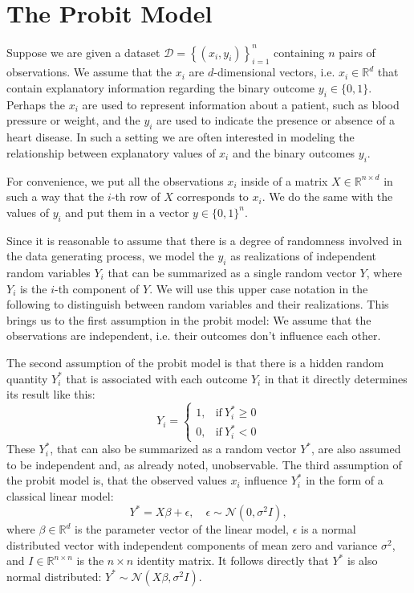 \section{The Probit Model}

Suppose we are given a dataset
$\mathcal{D} = \left\{ (x_i, y_i) \right\}_{i=1}^n$
containing $n$ pairs of observations.
We assume that the $x_i$ are $d$-dimensional vectors, i.e.
$x_i \in \mathbb{R}^d$ that contain explanatory information regarding
the binary outcome $y_i \in \{ 0,  1 \}$.
Perhaps the $x_i$ are used to represent information about a patient,
such as blood pressure or weight, and the $y_i$ are used to indicate
the presence or absence of a heart disease.
In such a setting we are often interested in modeling the relationship
between explanatory values of $x_i$ and the binary outcomes $y_i$.

For convenience, we put all the observations $x_i$ inside of a
matrix $X \in \mathbb{R}^{n \times d}$ in such a way that
the $i$-th row of $X$ corresponds to $x_i$.
We do the same with the values of $y_i$ and put them in a
vector $y \in \{0, 1\}^n$.

Since it is reasonable to assume that there is a degree of randomness
involved in the data generating process, we model the $y_i$ as realizations
of independent random variables $Y_i$ that can be summarized
as a single random vector $Y$, where $Y_i$ is the $i$-th component
of $Y$. We will use this upper case notation
in the following to distinguish between random variables and their
realizations. This brings us to the first assumption in the probit model:
We assume that the observations are independent, i.e. their outcomes don't
influence each other.

The second assumption of the probit model is that there is
a hidden random quantity
$Y_i^\ast$ that is associated with each outcome $Y_i$ in that it
directly determines its result like this:
\begin{equation}
    Y_i =
    \begin{cases}
        1, & \text{if}\ Y_i^\ast \geq 0 \\
        0, & \text{if}\ Y_i^\ast < 0
    \end{cases}
\end{equation}
These $Y_i^\ast$, that can also be summarized as a random vector $Y^\ast$,
are also assumed to be independent and, as already noted, unobservable.
The third assumption of the probit model is, that the observed values
$x_i$ influence $Y_i^\ast$ in the form of a classical linear model:
\begin{equation}
    Y^\ast = X \beta + \epsilon, \quad \epsilon \sim \mathcal{N}(0, \sigma^2 I),
\end{equation}
where $\beta \in \mathbb{R}^d$ is the parameter vector of the linear model,
$\epsilon$ is a normal distributed vector with independent components of
mean zero and variance $\sigma^2$,
and
$I \in \mathbb{R}^{n \times n}$ is the $n \times n$ identity matrix.
It follows directly that $Y^\ast$ is also normal distributed:
$Y^\ast \sim \mathcal{N}(X \beta, \sigma^2 I)$.

\newpage